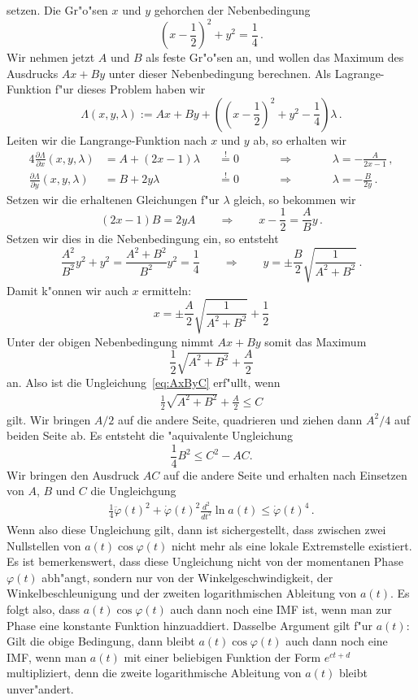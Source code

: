 \documentclass[a4paper]{scrartcl}
\newcommand{\pphi}{{\varphi}}
\newcommand{\defeq}{\overset{!}{=}}
\begin{document}
setzen. Die Gr"o"sen $x$ und $y$ gehorchen der Nebenbedingung
$$ \left(x-\frac12\right)^2 + y^2 = \frac14\,. $$
Wir nehmen jetzt $A$ und $B$ als feste Gr"o"sen an, und wollen das Maximum des Ausdrucks $Ax+By$ unter dieser Nebenbedingung berechnen. Als Lagrange-Funktion f"ur dieses Problem haben wir
$$ \Lambda(x,y,\lambda) 
:= Ax + By + \left( \left(x-\frac12\right)^2 + y^2 - \frac14 \right) \lambda \,. $$
Leiten wir die Langrange-Funktion nach $x$ und $y$ ab, so erhalten wir
\begin{alignat*}{4}
  \frac{\partial\Lambda}{\partial x}(x,y,\lambda) &= A + (2x-1)\lambda &&\defeq 0 
  &\qquad&\Longrightarrow &\qquad& \lambda = -\frac{A}{2x-1}\,, \\
  \frac{\partial\Lambda}{\partial y}(x,y,\lambda) &= B +  2y   \lambda &&\defeq 0 
  && \Longrightarrow && \lambda = -\frac{B}{2y}\,.
\end{alignat*}
Setzen wir die erhaltenen Gleichungen f"ur $\lambda$ gleich, so bekommen wir 
$$ (2x-1)B = 2yA \qquad \Longrightarrow \qquad
x-\frac12 = \frac AB y\,. $$
Setzen wir dies in die Nebenbedingung ein, so entsteht
$$ \frac{A^2}{B^2}y^2 + y^2 = \frac{A^2+B^2}{B^2}y^2 
= \frac14 \qquad \Longrightarrow \qquad
y=\pm\frac B2\sqrt{\frac{1}{A^2+B^2}}\,. $$
Damit k"onnen wir auch $x$ ermitteln:
$$ x = \pm\frac A2\sqrt{\frac{1}{A^2+B^2}} + \frac12 $$
Unter der obigen Nebenbedingung nimmt $Ax+By$ somit das Maximum
$$ \frac12 \sqrt{A^2+B^2}+\frac A2 $$
an. Also ist die Ungleichung~\eqref{eq:AxByC} erf"ullt, wenn 
\begin{align} \label{eq:intermediateABC}
  \frac12\sqrt{A^2+B^2}+\frac A2 \le C 
\end{align}
gilt. Wir bringen $A/2$ auf die andere Seite, quadrieren und ziehen dann $A^2/4$ auf beiden Seite ab. Es entsteht die "aquivalente Ungleichung
$$ \frac14 B^2 \le C^2 - AC. $$
Wir bringen den Ausdruck $AC$ auf die andere Seite und erhalten nach Einsetzen von $A$, $B$ und $C$ die Ungleichgung
\begin{align} \label{eq:condpphiiai}
  \frac14\ddot\pphi(t)^2 + \dot\pphi(t)^2\frac{d^2}{dt^2}\ln a(t) 
  \le \dot\pphi(t)^4\,.
\end{align}
Wenn also diese Ungleichung gilt, dann ist sichergestellt, dass zwischen zwei Nullstellen von $a(t)\cos\pphi(t)$ nicht mehr als eine lokale Extremstelle existiert. Es ist bemerkenswert, dass diese Ungleichung nicht von der momentanen Phase $\pphi(t)$ abh"angt, sondern nur von der Winkelgeschwindigkeit, der Winkelbeschleunigung und der zweiten logarithmischen Ableitung von $a(t)$. Es folgt also, dass $a(t)\cos\pphi(t)$ auch dann noch eine IMF ist, wenn man zur Phase eine konstante Funktion hinzuaddiert. Dasselbe Argument gilt f"ur $a(t)$: Gilt die obige Bedingung, dann bleibt $a(t)\cos\pphi(t)$ auch dann noch eine IMF, wenn man  $a(t)$ mit einer beliebigen Funktion der Form $e^{ct+d}$ multipliziert, denn die zweite logarithmische Ableitung von $a(t)$ bleibt unver"andert. 
\end{document}
